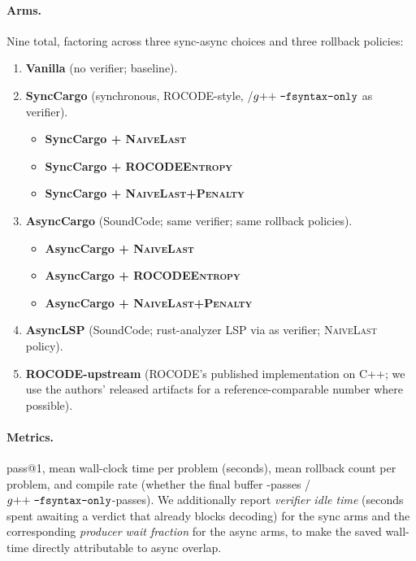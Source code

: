 \paragraph{Arms.} Nine total, factoring across three sync-async
choices and three rollback policies:
\begin{enumerate}[itemsep=2pt,topsep=2pt]
\item \textbf{Vanilla} (no verifier; baseline).
\item \textbf{SyncCargo} (synchronous, ROCODE-style, /$g{+}{+}\;\texttt{-fsyntax-only}$ as verifier).
  \begin{itemize}[itemsep=2pt,topsep=2pt]
  \item \textbf{SyncCargo + \textsc{NaiveLast}}
  \item \textbf{SyncCargo + \textsc{ROCODEEntropy}}
  \item \textbf{SyncCargo + \textsc{NaiveLast+Penalty}}
  \end{itemize}
\item \textbf{AsyncCargo} (SoundCode; same verifier; same rollback
  policies).
  \begin{itemize}[itemsep=2pt,topsep=2pt]
  \item \textbf{AsyncCargo + \textsc{NaiveLast}}
  \item \textbf{AsyncCargo + \textsc{ROCODEEntropy}}
  \item \textbf{AsyncCargo + \textsc{NaiveLast+Penalty}}
  \end{itemize}
\item \textbf{AsyncLSP} (SoundCode; rust-analyzer LSP via
   as verifier; \textsc{NaiveLast} policy).
\item \textbf{ROCODE-upstream} (ROCODE's published implementation
  on C++; we use the authors' released artifacts for a
  reference-comparable number where possible).
\end{enumerate}

\paragraph{Metrics.}
pass@1, mean wall-clock time per problem (seconds), mean rollback
count per problem, and compile rate (whether the final buffer
-passes / $g{+}{+}\;\texttt{-fsyntax-only}$-passes).
We additionally report \emph{verifier idle time} (seconds spent
awaiting a verdict that already blocks decoding) for the sync arms
and the corresponding \emph{producer wait fraction} for the async
arms, to make the saved wall-time directly attributable to async
overlap.

